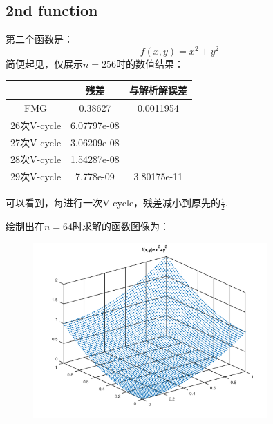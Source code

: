 \documentclass[a4paper,11.5pt,UTF8]{ctexart}
\begin{document}
\begin{large}
\subsection{2nd function}
\par 第二个函数是：$$f(x,y)=x^2+y^2$$
简便起见，仅展示$n=256$时的数值结果：
\begin{center}
	\begin{tabular}{|c|c|c|}
		\hline
		& 残差 & 与解析解误差  \\
		\hline
		FMG & 0.38627 & 0.0011954  \\
		\hline
		26次V-cycle & 6.07797e-08 & ~  \\
		\hline
		27次V-cycle & 3.06209e-08 & ~  \\
		\hline
		28次V-cycle & 1.54287e-08 & ~  \\
		\hline
		29次V-cycle & 7.778e-09 & 3.80175e-11  \\
		\hline
	\end{tabular}
\end{center}
可以看到，每进行一次V-cycle，残差减小到原先的$\frac{1}{2}$.
\par 绘制出在$n=64$时求解的函数图像为：
\begin{figure}[H]
	\centering
	\includegraphics[width=0.8\textwidth,height=0.6\textwidth]{../output/figure/dim2_2.png}
\end{figure}


\end{large}
\end{document}
